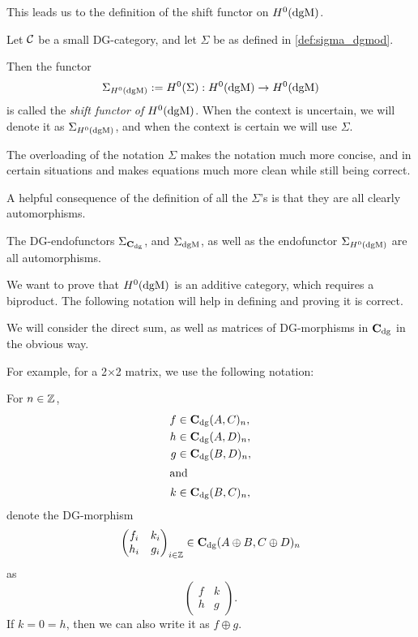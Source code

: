 This leads us to the definition of the shift functor on \( H^0(\operatorname{dgM}) \).

\begin{definition}
    \label{def:sigma_h_0_dgmod}
    Let \( {\mathcal{C}} \) be a small DG-category, and let \( \Sigma \) be as defined in \autoref{def:sigma_dgmod}.

    Then the functor
    \[
        \Sigma_{H^0(\operatorname{dgM})} := H^0(\Sigma): H^0(\operatorname{dgM}) \to H^0(\operatorname{dgM})
    \]
    is called the \emph{shift functor of \( H^0(\operatorname{dgM}) \)}. When the context is uncertain, we will denote it as \( \Sigma_{H^0(\operatorname{dgM})} \), and when the context is certain we will use \( \Sigma \).
\end{definition}

The overloading of the notation \( \Sigma \) makes the notation much more concise, and in certain situations and makes equations much more clean while still being correct.

A helpful consequence of the definition of all the \( \Sigma \)'s is that they are all clearly automorphisms.
\begin{remark}
    \label{rem:dgm_sigma_automorphism}
    The DG-endofunctors \( \Sigma_{\operatorname{\mathbf{C}}_{\operatorname{dg}}} \), and \( \Sigma_{\operatorname{dgM}} \), as well as the endofunctor \( \Sigma_{H^0(\operatorname{dgM})} \) are all automorphisms.
\end{remark}

We want to prove that \( H^0(\operatorname{dgM}) \) is an additive category, which requires a biproduct. The following notation will help in defining and proving it is correct.

\begin{notation}
    \label{not:c_dg_matrix_direct_sum}
    We will consider the direct sum, as well as matrices of DG-morphisms in \( \operatorname{\mathbf{C}}_{\operatorname{dg}} \) in the obvious way.

    For example, for a 2×2 matrix, we use the following notation:

    For \( n \in {\mathbb{Z}} \),
    \begin{align*}
        f &\in \operatorname{\mathbf{C}}_{\operatorname{dg}}(A, C)_n, \\
        h &\in \operatorname{\mathbf{C}}_{\operatorname{dg}}(A, D)_n, \\
        g &\in \operatorname{\mathbf{C}}_{\operatorname{dg}}(B, D)_n, \\
        \intertext{and}
        k &\in \operatorname{\mathbf{C}}_{\operatorname{dg}}(B, C)_n,
    \end{align*}
    denote the DG-morphism
    \[
        \begin{pmatrix}
            f_i & k_i \\
            h_i & g_i
        \end{pmatrix}_{i \in {\mathbb{Z}}}
        \in
        \operatorname{\mathbf{C}}_{\operatorname{dg}}(A \oplus B, C \oplus D)_n
    \]
    as
    \[
        \begin{pmatrix}
            f & k \\
            h & g
        \end{pmatrix}.
    \]
    If \( k = 0 = h \), then we can also write it as \( f \oplus g \).
\end{notation}

